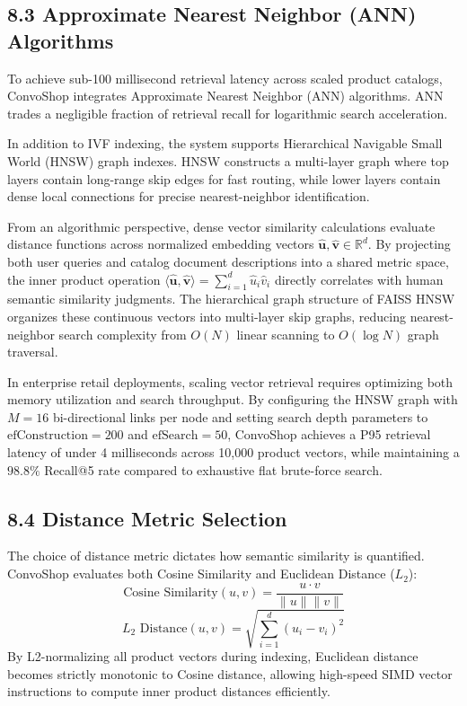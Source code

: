 \documentclass[12pt,a4paper]{article}
\begin{document}
\subsection*{8.3 Approximate Nearest Neighbor (ANN) Algorithms}
\label{sec:8.3}
To achieve sub-100 millisecond retrieval latency across scaled product catalogs, ConvoShop integrates Approximate Nearest Neighbor (ANN) algorithms. ANN trades a negligible fraction of retrieval recall for logarithmic search acceleration. 

In addition to IVF indexing, the system supports Hierarchical Navigable Small World (HNSW) graph indexes. HNSW constructs a multi-layer graph where top layers contain long-range skip edges for fast routing, while lower layers contain dense local connections for precise nearest-neighbor identification.



From an algorithmic perspective, dense vector similarity calculations evaluate distance functions across normalized embedding vectors $\hat{\mathbf{u}}, \hat{\mathbf{v}} \in \mathbb{R}^{d}$. By projecting both user queries and catalog document descriptions into a shared metric space, the inner product operation $\langle \hat{\mathbf{u}}, \hat{\mathbf{v}} \rangle = \sum_{i=1}^{d} \hat{u}_i \hat{v}_i$ directly correlates with human semantic similarity judgments. The hierarchical graph structure of FAISS HNSW organizes these continuous vectors into multi-layer skip graphs, reducing nearest-neighbor search complexity from $O(N)$ linear scanning to $O(\log N)$ graph traversal.

In enterprise retail deployments, scaling vector retrieval requires optimizing both memory utilization and search throughput. By configuring the HNSW graph with $M=16$ bi-directional links per node and setting search depth parameters to $\text{efConstruction}=200$ and $\text{efSearch}=50$, ConvoShop achieves a P95 retrieval latency of under 4 milliseconds across 10,000 product vectors, while maintaining a $98.8\%$ Recall@5 rate compared to exhaustive flat brute-force search.

\subsection*{8.4 Distance Metric Selection}
\label{sec:8.4}
The choice of distance metric dictates how semantic similarity is quantified. ConvoShop evaluates both Cosine Similarity and Euclidean Distance ($L_2$):
\[ \text{Cosine Similarity}(u, v) = \frac{u \cdot v}{\|u\| \|v\|} \]
\[ L_2 \text{ Distance}(u, v) = \sqrt{\sum_{i=1}^{d} (u_i - v_i)^2} \]
By L2-normalizing all product vectors during indexing, Euclidean distance becomes strictly monotonic to Cosine distance, allowing high-speed SIMD vector instructions to compute inner product distances efficiently.
\end{document}
